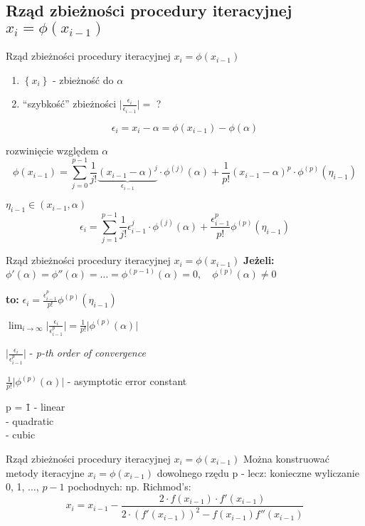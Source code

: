 \subsection{Rząd zbieżności procedury iteracyjnej $x_{i} = \phi(x_{i-1})$}
\begin{frame}{Rząd zbieżności procedury iteracyjnej $x_{i} = \phi(x_{i-1})$}
	\begin{enumerate}
		\item $\left\{x_{i}\right\} $ - zbieżność do $\alpha$
		\item ``szybkość'' zbieżności $\lvert \frac{\epsilon_{i}}{\epsilon_{i-1}} \rvert = $ ?
	\end{enumerate}
	\[
		\epsilon_{i} = x_{i} - \alpha = \phi(x_{i-1}) - \phi(\alpha)
	\]
	
	rozwinięcie względem $\alpha$
	\[
		\phi(x_{i-1}) = \sum_{j=0}^{p-1} \frac{1}{j!} \underbrace{(x_{i-1} - \alpha)^{j}}_{\epsilon_{i-1}} \cdot \phi^{(j)}(\alpha) + \frac{1}{p!}(x_{i-1}-\alpha)^{p} \cdot \phi^{(p)}(\eta_{i-1})
	\]
	
	$\eta_{i-1} \in (x_{i-1}, \alpha)$
	\[
		\epsilon_{i} = \sum_{j=1}^{p-1}\frac{1}{j!} \epsilon_{i-1}^{j} \cdot \phi^{(j)}(\alpha) + \frac{\epsilon_{i-1}^{p}}{p!} \phi^{(p)}(\eta_{i-1})
	\]
\end{frame}
\begin{frame}{Rząd zbieżności procedury iteracyjnej $x_{i} = \phi(x_{i-1})$}
	\textbf{Jeżeli: } $\phi'(\alpha) = \phi''(\alpha) = \ldots = \phi^{(p-1)}(\alpha) = 0,\quad \phi^{(p)}(\alpha) \neq 0$\linebreak
	
	\textbf{to: } $\epsilon_{i} = \frac{\epsilon_{i-1}^{p}}{p!} \phi^{(p)}(\eta_{i-1})$\linebreak
	
	$\lim_{i \rightarrow \infty} \lvert \frac{\epsilon_{i}}{\epsilon_{i-1}^{p}} \rvert = \frac{1}{p!} \lvert \phi^{(p)}(\alpha) \rvert$\linebreak
	
	$\lvert \frac{\epsilon_{i}}{\epsilon_{i-1}^{p}} \rvert$ - \textit{p-th order of convergence}\linebreak
	
	$\frac{1}{p!} \lvert \phi^{(p)}(\alpha) \rvert$ - asymptotic error constant
	\begin{tabbing}
		p = \= 1 - linear\\
		 - quadratic\\
		 - cubic
	\end{tabbing}
	
\end{frame}
\begin{frame}{Rząd zbieżności procedury iteracyjnej $x_{i} = \phi(x_{i-1})$}
	Można konstruować metody iteracyjne $x_{i} = \phi(x_{i-1})$ dowolnego rzędu p - lecz: konieczne wyliczanie 0, 1, $\ldots$, $p-1$ pochodnych:\linebreak
	np. Richmod's:
	\[
	x_{i} = x_{i-1} - \frac{2 \cdot f(x_{i-1}) \cdot f'(x_{i-1})}{2 \cdot (f'(x_{i-1}))^{2} - f(x_{i-1}) f''(x_{i-1})}
	\]
\end{frame}